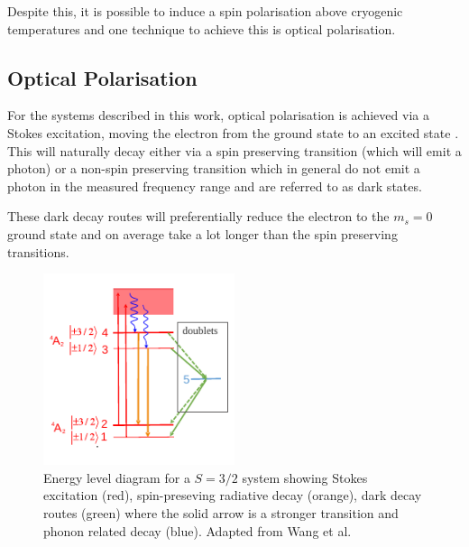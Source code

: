 Despite this, it is possible to induce a spin polarisation above cryogenic temperatures and one technique to achieve this is optical polarisation.


\subsection{Optical Polarisation}


For the systems described in this work, optical polarisation is achieved via a Stokes excitation, moving the electron from the ground state to an excited state \cite{PhysRevB.105.165108}. This will naturally decay either via a spin preserving transition (which will emit a photon) or a non-spin preserving transition which in general do not emit a photon in the measured frequency range and are referred to as dark states.

These dark decay routes will preferentially reduce the electron to the $m_s = 0$ ground state and on average take a lot longer than the spin preserving transitions.

\begin{figure}
	\begin{center}
		\includegraphics[width=0.5\textwidth]{figures/actual-stokes.pdf}
		\caption{Energy level diagram for a $S=3/2$ system showing Stokes excitation (red), spin-preseving radiative decay (orange), dark decay routes (green) where the solid arrow is a stronger transition and phonon related decay (blue). Adapted from Wang et al.}\label{fig:big_stokes}
	\end{center}
\end{figure}



